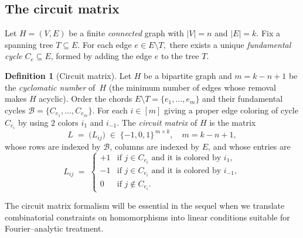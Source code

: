 \documentclass[12pt,a4paper]{article}
\theoremstyle{definition}
\theoremstyle{plain}
\theoremstyle{definition}
\newtheorem{definition}[theorem]{Definition}
\begin{document}
\subsection{The circuit matrix}\label{subsec:circuit-matrix}

Let $H = (V, E)$ be a finite \emph{connected} graph with $|V| = n$ and $|E| = k$.  
Fix a spanning tree $T \subseteq E$. For each edge
\(
e \in E \setminus T,
\)  
there exists a unique \emph{fundamental cycle}  
\(C_e \subseteq E\),  
formed by adding the edge $e$ to the tree $T$.

\begin{definition}[Circuit matrix]
Let $H$ be a bipartite graph and $m=k-n+1$ be the \emph{cyclomatic number} of~$H$
(the minimum number of edges whose removal makes $H$ acyclic).
Order the chords
\(E\setminus T=\{e_{1},\dots,e_{m}\}\)
and their fundamental cycles
\(\mathcal{B}=\{C_{e_{1}},\dots,C_{e_{m}}\}\). For each $i\in [m]$ giving a proper edge coloring of cycle $C_{e_{i}}$ by using $2$ colors $i_1$ and $i_{-1}$.
The \emph{circuit matrix} of $H$ is the matrix
\[
L
   \;=\;
   \bigl(L_{ij}\bigr)
   \;\in\;\{-1,0,1\}^{\,m\times k},
\quad
m=k-n+1,
\]
whose rows are indexed by $\mathcal{B}$, columns are indexed by $E$, and whose entries are
\[
L_{ij}\;=\;
\begin{cases}
+1 &\text{if $j\in C_{e_i}$ and it is colored by $i_1$},\\[3pt]
-1 &\text{if $j\in C_{e_i}$ and it is colored by $i_{-1}$},\\[3pt]
0  &\text{if $j\notin C_{e_i}$}.
\end{cases}
\]
\end{definition}

The circuit matrix formalism will be essential in the sequel when we translate combinatorial constraints on homomorphisms into linear conditions suitable for Fourier–analytic treatment.
\end{document}

